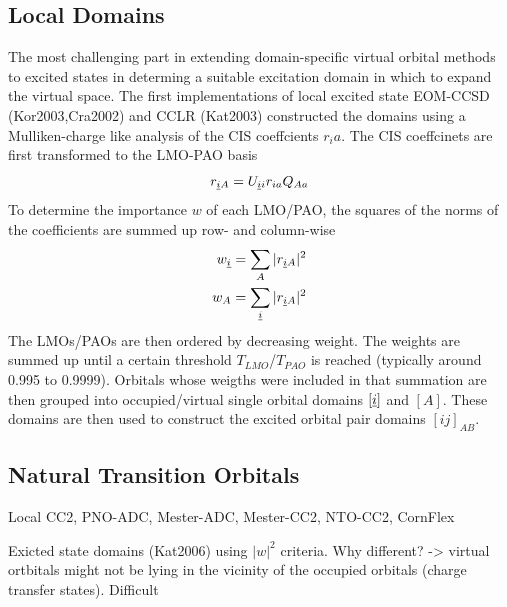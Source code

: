 \subsection{Local Domains}

The most challenging part in extending domain-specific virtual orbital methods to excited states in determing a suitable excitation domain in which to expand the virtual space. The first implementations of local excited state EOM-CCSD (Kor2003,Cra2002) and CCLR (Kat2003) constructed the domains using a Mulliken-charge like analysis of the CIS coeffcients $r_ia$. The CIS coeffcinets are first transformed to the LMO-PAO basis
\begin{equation}
r_{\underline{i} A} = U_{\underline{i} i } r_{ia} Q_{Aa} 
\end{equation}
\noindent To determine the importance $w$ of each LMO/PAO, the squares of the norms of the coefficients are summed up row- and column-wise
\begin{equation}
\begin{split}
w_{\underline{i}} &= \sum_A |r_{\underline{i} A}|^2 \\
w_{A} &= \sum_{\underline{i}} |r_{\underline{i} A}|^2
\end{split}
\end{equation}
\noindent The LMOs/PAOs are then ordered by decreasing weight. The weights are summed up until a certain threshold $T_{LMO}$/$T_{PAO}$ is reached (typically around 0.995 to 0.9999). Orbitals whose weigths were included in that summation are then grouped into occupied/virtual single orbital domains $[\underline{i}]$ and $[A]$. These domains are then used to construct the excited orbital pair domains $[ij]_{AB}$. 

% 

\subsection{Natural Transition Orbitals} 

Local CC2, PNO-ADC, Mester-ADC, Mester-CC2, NTO-CC2, CornFlex

Exicted state domains (Kat2006) using $|w|^2$ criteria. Why different? -> virtual ortbitals might not be lying in the vicinity of the occupied orbitals (charge transfer states). Difficult 

